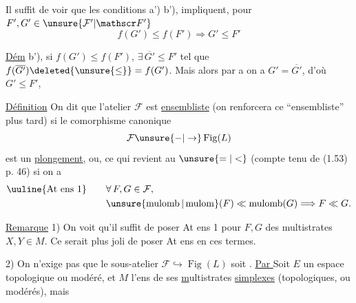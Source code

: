
 Il suffit de voir que  les conditions a') b'),  impliquent,  pour $F',G'\in\unsure{\mathcal F'|\mathscr F'}$
\[
f(G')\leq f(F')\Longrightarrow G'\leq F'
\]

\uline{Dém}  b'),  si $f(G')\leq f(F')$, $\exists\,\overline{G'}\leq F'$ tel que $f(\overline{G'})\deleted{\unsure{\leq}}=f(G')$. Mais alors par a on a $G'=\overline{G'}$, d'où $G'\leq F'$, 

\uline{Définition} On dit que l'atelier $\mathcal F$  est   \uline{ensembliste} (on renforcera ce ``ensembliste'' plus tard) si le comorphisme canonique
\[
\mathcal F\unsure{-|\to}\operatorname{Fig}(L)
\]
est un \uline{plongement}, ou, ce qui revient au $\unsure{=|<}$ (compte tenu de (1.53) p. 46) si on a
\[
\begin{aligned}
\text{\uuline{At ens 1}}\qquad &\forall\, F,G\in\mathcal F,\\
&\unsure{\operatorname{mulomb}|\operatorname{mulom}}(F)\ll\operatorname{mulomb}(G)\Longrightarrow F\ll G.
\end{aligned}
\]

\uline{Remarque} 1) On voit qu'il suffit de poser At ens 1 pour $F,G$ des multistrates $X,Y\in M$. Ce serait plus joli de poser At ens en ces termes.

2) On n'exige pas que le sous-atelier $\mathcal F\hookrightarrow\operatorname{Fig}(L)$ soit . \uline{Par }    Soit $E$ un espace topologique ou modéré, et $M$ l'ens de ses \uline{m}ultistrates \uline{simplexes} (topologiques, ou modérés), mais
